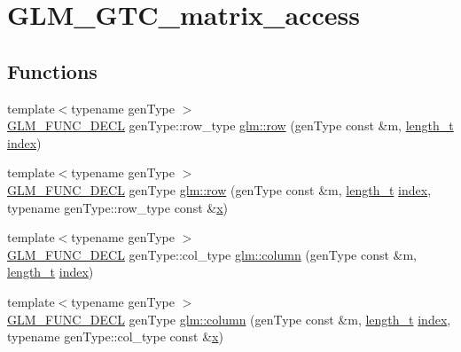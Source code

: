 \hypertarget{group__gtc__matrix__access}{}\section{G\+L\+M\+\_\+\+G\+T\+C\+\_\+matrix\+\_\+access}
\label{group__gtc__matrix__access}
\subsection*{Functions}
\begin{DoxyCompactItemize}
\item 
{\footnotesize template$<$typename gen\+Type $>$ }\\\mbox{\hyperlink{setup_8hpp_ab2d052de21a70539923e9bcbf6e83a51}{G\+L\+M\+\_\+\+F\+U\+N\+C\+\_\+\+D\+E\+CL}} gen\+Type\+::row\+\_\+type \mbox{\hyperlink{group__gtc__matrix__access_ga259e5ebd0f31ec3f83440f8cae7f5dba}{glm\+::row}} (gen\+Type const \&m, \mbox{\hyperlink{namespaceglm_a090a0de2260835bee80e71a702492ed9}{length\+\_\+t}} \mbox{\hyperlink{glad_8h_a6468fe3bfff24d7d939eb21863b88268}{index}})
\item 
{\footnotesize template$<$typename gen\+Type $>$ }\\\mbox{\hyperlink{setup_8hpp_ab2d052de21a70539923e9bcbf6e83a51}{G\+L\+M\+\_\+\+F\+U\+N\+C\+\_\+\+D\+E\+CL}} gen\+Type \mbox{\hyperlink{group__gtc__matrix__access_gaadcc64829aadf4103477679e48c7594f}{glm\+::row}} (gen\+Type const \&m, \mbox{\hyperlink{namespaceglm_a090a0de2260835bee80e71a702492ed9}{length\+\_\+t}} \mbox{\hyperlink{glad_8h_a6468fe3bfff24d7d939eb21863b88268}{index}}, typename gen\+Type\+::row\+\_\+type const \&\mbox{\hyperlink{glad_8h_a92d0386e5c19fb81ea88c9f99644ab1d}{x}})
\item 
{\footnotesize template$<$typename gen\+Type $>$ }\\\mbox{\hyperlink{setup_8hpp_ab2d052de21a70539923e9bcbf6e83a51}{G\+L\+M\+\_\+\+F\+U\+N\+C\+\_\+\+D\+E\+CL}} gen\+Type\+::col\+\_\+type \mbox{\hyperlink{group__gtc__matrix__access_ga96022eb0d3fae39d89fc7a954e59b374}{glm\+::column}} (gen\+Type const \&m, \mbox{\hyperlink{namespaceglm_a090a0de2260835bee80e71a702492ed9}{length\+\_\+t}} \mbox{\hyperlink{glad_8h_a6468fe3bfff24d7d939eb21863b88268}{index}})
\item 
{\footnotesize template$<$typename gen\+Type $>$ }\\\mbox{\hyperlink{setup_8hpp_ab2d052de21a70539923e9bcbf6e83a51}{G\+L\+M\+\_\+\+F\+U\+N\+C\+\_\+\+D\+E\+CL}} gen\+Type \mbox{\hyperlink{group__gtc__matrix__access_ga9e757377523890e8b80c5843dbe4dd15}{glm\+::column}} (gen\+Type const \&m, \mbox{\hyperlink{namespaceglm_a090a0de2260835bee80e71a702492ed9}{length\+\_\+t}} \mbox{\hyperlink{glad_8h_a6468fe3bfff24d7d939eb21863b88268}{index}}, typename gen\+Type\+::col\+\_\+type const \&\mbox{\hyperlink{glad_8h_a92d0386e5c19fb81ea88c9f99644ab1d}{x}})
\end{DoxyCompactItemize}


